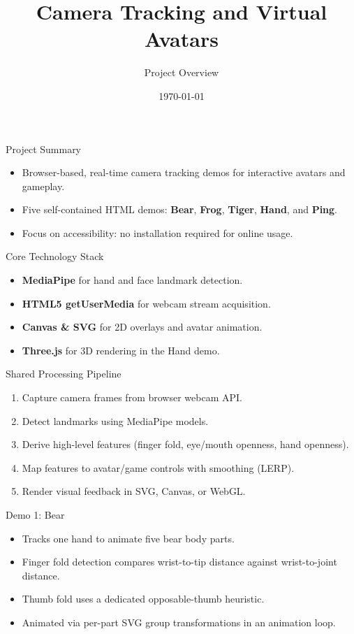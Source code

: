 \documentclass[aspectratio=169]{beamer}
\title{Camera Tracking and Virtual Avatars}
\author{Project Overview}
\date{\today}
\begin{document}
\begin{frame}
  \titlepage
\end{frame}

\begin{frame}{Project Summary}
  \begin{itemize}
    \item Browser-based, real-time camera tracking demos for interactive avatars and gameplay.
    \item Five self-contained HTML demos: \textbf{Bear}, \textbf{Frog}, \textbf{Tiger}, \textbf{Hand}, and \textbf{Ping}.
    \item Focus on accessibility: no installation required for online usage.
  \end{itemize}
\end{frame}

\begin{frame}{Core Technology Stack}
  \begin{itemize}
    \item \textbf{MediaPipe} for hand and face landmark detection.
    \item \textbf{HTML5 getUserMedia} for webcam stream acquisition.
    \item \textbf{Canvas \& SVG} for 2D overlays and avatar animation.
    \item \textbf{Three.js} for 3D rendering in the Hand demo.
  \end{itemize}
\end{frame}

\begin{frame}{Shared Processing Pipeline}
  \begin{enumerate}
    \item Capture camera frames from browser webcam API.
    \item Detect landmarks using MediaPipe models.
    \item Derive high-level features (finger fold, eye/mouth openness, hand openness).
    \item Map features to avatar/game controls with smoothing (LERP).
    \item Render visual feedback in SVG, Canvas, or WebGL.
  \end{enumerate}
\end{frame}

\begin{frame}{Demo 1: Bear}
  \begin{itemize}
    \item Tracks one hand to animate five bear body parts.
    \item Finger fold detection compares wrist-to-tip distance against wrist-to-joint distance.
    \item Thumb fold uses a dedicated opposable-thumb heuristic.
    \item Animated via per-part SVG group transformations in an animation loop.
  \end{itemize}
\end{frame}
\end{document}
